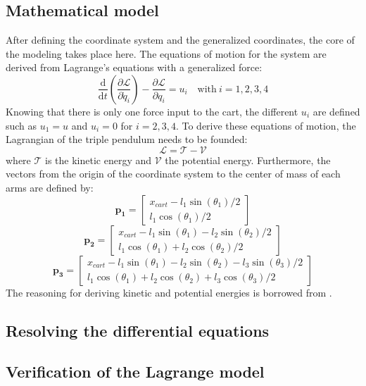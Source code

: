 \documentclass[a4paper,12pt,twoside]{article}
\begin{document}
\subsection{Mathematical model}
After defining the coordinate system and the generalized coordinates, the core of the modeling takes place here. The equations of motion for the system are derived from Lagrange's equations with a generalized force:
\begin{equation}
	\frac{\text{d}}{\text{d}t} \left(\frac{\partial \mathcal{L}}{\partial \dot q_i}\right) - \frac{\partial \mathcal{L}}{\partial q_i} = u_i
	\quad \text{with}\ i=1,2,3,4
\end{equation}
Knowing that there is only one force input to the cart, the different $u_i$ are defined such as $u_1 = u$ and $u_i = 0$ for $i=2,3,4$.
To derive these equations of motion, the Lagrangian of the triple pendulum needs to be founded:
\begin{equation}
	\mathcal{L} = \mathcal{T} - \mathcal{V}
\end{equation}
where $\mathcal{T}$ is the kinetic energy and $\mathcal{V}$ the potential energy. Furthermore, the vectors from the origin of the coordinate system to the center of mass of each arms are defined by:
\[
	\mathbf{p_1} =
	\begin{bmatrix}
		x_{cart} - l_1 \sin(\theta_1)/2 \\
		l_1 \cos(\theta_1)/2
	\end{bmatrix}
\]
\[
	\mathbf{p_2} =
	\begin{bmatrix}
		x_{cart} - l_1 \sin(\theta_1) - l_2 \sin(\theta_2)/2 \\
		l_1 \cos(\theta_1) + l_2 \cos(\theta_2)/2
	\end{bmatrix}
\]
\[
	\mathbf{p_3} =
	\begin{bmatrix}
		x_{cart} - l_1 \sin(\theta_1) - l_2 \sin(\theta_2) - l_3 \sin(\theta_3)/2 \\
		l_1 \cos(\theta_1) + l_2 \cos(\theta_2) + l_3 \cos(\theta_3)/2
	\end{bmatrix}
\]
The reasoning for deriving kinetic and potential energies is borrowed from \cite{}.

\subsection{Resolving the differential equations}

\subsection{Verification of the Lagrange model}
\end{document}
